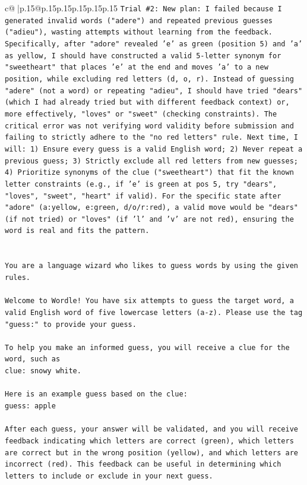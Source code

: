 \documentclass{article}
\begin{document}
{\begin{supertabular}{c@{$\;$}|p{.15\linewidth}@{}p{.15\linewidth}p{.15\linewidth}p{.15\linewidth}p{.15\linewidth}p{.15\linewidth}}
{{{\texttt{Trial \#2: New plan: I failed because I generated invalid words ("adere") and repeated previous guesses ("adieu"), wasting attempts without learning from the feedback. Specifically, after "adore" revealed 'e' as green (position 5) and 'a' as yellow, I should have constructed a valid 5{-}letter synonym for "sweetheart" that places 'e' at the end and moves 'a' to a new position, while excluding red letters (d, o, r). Instead of guessing "adere" (not a word) or repeating "adieu", I should have tried "dears" (which I had already tried but with different feedback context) or, more effectively, "loves" or "sweet" (checking constraints). The critical error was not verifying word validity before submission and failing to strictly adhere to the "no red letters" rule. Next time, I will: 1) Ensure every guess is a valid English word; 2) Never repeat a previous guess; 3) Strictly exclude all red letters from new guesses; 4) Prioritize synonyms of the clue ("sweetheart") that fit the known letter constraints (e.g., if 'e' is green at pos 5, try "dears", "loves", "sweet", "heart" if valid). For the specific state after "adore" (a:yellow, e:green, d/o/r:red), a valid move would be "dears" (if not tried) or "loves" (if 'l' and 'v' are not red), ensuring the word is real and fits the pattern.} \\
\\ 
\\ 
\texttt{You are a language wizard who likes to guess words by using the given rules.} \\
\\ 
\texttt{Welcome to Wordle! You have six attempts to guess the target word, a valid English word of five lowercase letters (a{-}z). Please use the tag "guess:" to provide your guess.} \\
\\ 
\texttt{To help you make an informed guess, you will receive a clue for the word, such as} \\
\texttt{clue: snowy white.} \\
\\ 
\texttt{Here is an example guess based on the clue: } \\
\texttt{guess: apple} \\
\\ 
\texttt{After each guess, your answer will be validated, and you will receive feedback indicating which letters are correct (green), which letters are correct but in the wrong position (yellow), and which letters are incorrect (red). This feedback can be useful in determining which letters to include or exclude in your next guess.} \\
}}}
\end{supertabular}}
\end{document}
